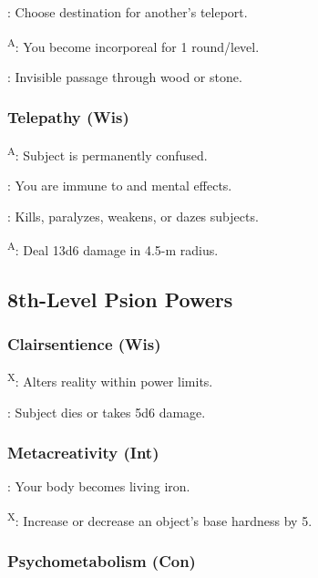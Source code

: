 : Choose destination for another's teleport.

\textsuperscript{A}: You become incorporeal for 1 round/level.

: Invisible passage through wood or stone.


\subsubsection{Telepathy (Wis)}

\textsuperscript{A}: Subject is permanently confused.

: You are immune to  and mental effects.

: Kills, paralyzes, weakens, or dazes subjects.

\textsuperscript{A}: Deal 13d6 damage in 4.5-m radius.



\subsection{8th-Level Psion Powers}


\subsubsection{Clairsentience (Wis)}

\textsuperscript{X}: Alters reality within power limits.

: Subject dies or takes 5d6 damage.


\subsubsection{Metacreativity (Int)}

: Your body becomes living iron.

\textsuperscript{X}: Increase or decrease an object's base hardness by 5.




\subsubsection{Psychometabolism (Con)}

